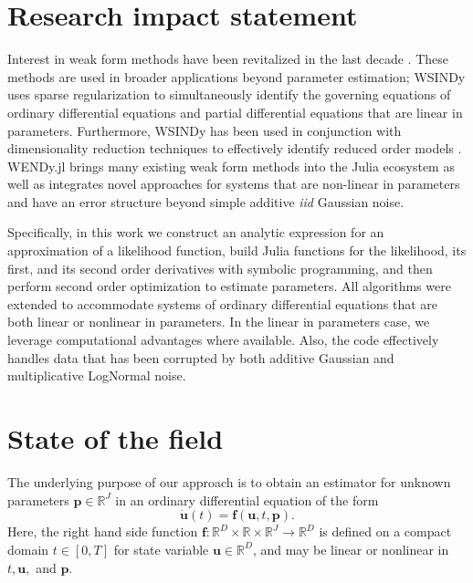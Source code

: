 \documentclass{juliacon}
\newcommand{\params}{\mathbf{p}}
\newcommand{\stateVar}{\boldsymbol{u}}
\begin{document}
\section{Research impact statement}

Interest in weak form methods have been revitalized in the last decade \citep{MessengerTranDukicEtAl2024SIAMNews}. These methods are used in broader applications beyond parameter estimation; WSINDy uses sparse regularization to simultaneously identify the governing equations of ordinary differential equations \citep{MessengerBortz2021MultiscaleModelSimul} and partial differential equations \citep{MessengerBortz2021JComputPhys} that are linear in parameters. Furthermore, WSINDy has been used in conjunction with dimensionality reduction techniques to effectively identify reduced order models \citep{TranHeMessengerEtAl2024ComputMethodsApplMechEng}.
WENDy.jl brings many existing weak form methods \citep{BortzMessengerDukic2023BullMathBiol} into the Julia ecosystem as well as integrates novel approaches for systems that are non-linear in parameters and have an error structure beyond simple additive {\it iid}  Gaussian noise. 

Specifically, in this work we construct an analytic expression for an approximation of a likelihood function, build Julia functions for the likelihood, its first, and its second order derivatives with symbolic programming, and then perform second order optimization to estimate parameters. All algorithms were extended to accommodate systems of ordinary differential equations that are both linear or nonlinear in parameters. In the linear in parameters case, we leverage computational advantages where available. Also, the code effectively handles data that has been corrupted by both additive Gaussian and multiplicative LogNormal noise.

\section{State of the field}

The underlying purpose of our approach is to obtain an estimator for unknown parameters $\params \in \mathbb{R}^J$ in an ordinary differential equation of the form 
\begin{equation} \label{eq:ode}
    \dot{\stateVar}(t) = \mathbf{f}(\stateVar, t, \params).
\end{equation}
Here, the right hand side function $\mathbf{f}: \mathbb{R}^D \times \mathbb{R} \times \mathbb{R}^J \rightarrow \mathbb{R}^D$  is defined on a compact domain $t\in [0,T]$ for state variable $\stateVar\in \mathbb{R}^D$, and  may be linear or nonlinear in $t,\stateVar,$ and $\params$.
\end{document}
